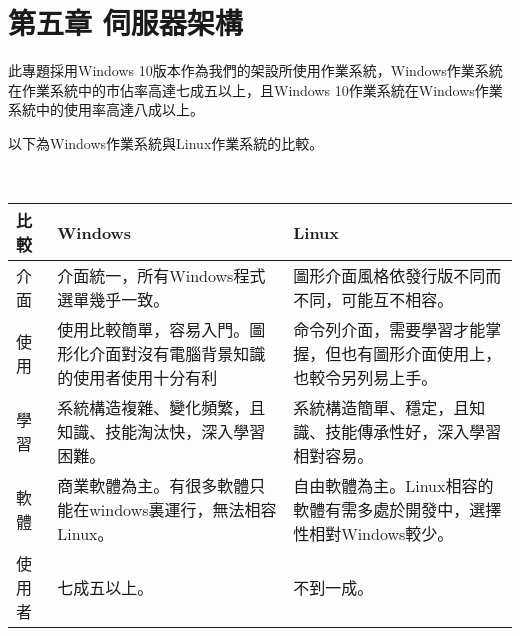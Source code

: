 \chapter{第五章 \quad 伺服器架構}
\renewcommand{\baselinestretch}{10} %
\par
\renewcommand{\baselinestretch}{1} %
\twelve \qquad 此專題採用Windows 10版本作為我們的架設所使用作業系統，Windows作業系統在作業系統中的市佔率高達七成五以上，且Windows 10作業系統在Windows作業系統中的使用率高達八成以上。
\\
\par
\renewcommand{\baselinestretch}{1} %
\twelve \hspace{0.5em} 以下為Windows作業系統與Linux作業系統的比較。
\par
\\
\begin{center}
\begin{tabular}{|l|p{6.5cm}|p{6.5cm}|} %
\hline
比較&Windows&Linux 
\\
\hline
介面&介面統一，所有Windows程式選單幾乎一致。&圖形介面風格依發行版不同而不同，可能互不相容。
\\
\hline
使用&使用比較簡單，容易入門。圖形化介面對沒有電腦背景知識的使用者使用十分有利&命令列介面，需要學習才能掌握，但也有圖形介面使用上，也較令另列易上手。
\\
\hline
學習&系統構造複雜、變化頻繁，且知識、技能淘汰快，深入學習困難。&系統構造簡單、穩定，且知識、技能傳承性好，深入學習相對容易。
\\
\hline
軟體&商業軟體為主。有很多軟體只能在windows裏運行，無法相容Linux。&自由軟體為主。Linux相容的軟體有需多處於開發中，選擇性相對Windows較少。
\\
\hline
使用者&七成五以上。&不到一成。
\\
\hline
\end{tabular}
\end{center}
\par

\renewcommand{\baselinestretch}{20} %
